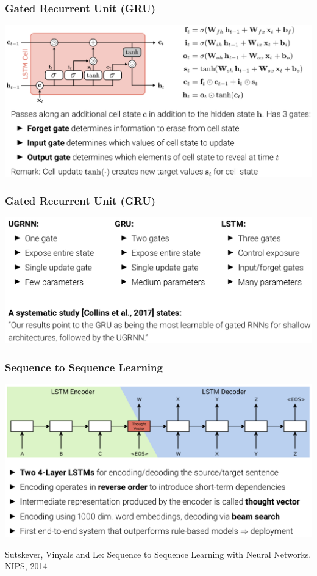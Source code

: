 \documentclass[10pt]{beamer}
\begin{document}
\begin{frame}
  \frametitle{Gated Recurrent Unit (GRU)}
\begin{center}
\includegraphics[width=.95\textwidth]{images/s21}
\end{center}
\end{frame}

\begin{frame}
  \frametitle{Gated Recurrent Unit (GRU)}
\begin{center}
\includegraphics[width=.95\textwidth]{images/missing}
\end{center}
\end{frame}


\begin{frame}
  \frametitle{Sequence to Sequence Learning}
\begin{center}
\includegraphics[width=.9\textwidth]{images/sa}
\end{center}
\scriptsize{Sutskever, Vinyals and Le: Sequence to Sequence Learning with Neural Networks. NIPS, 2014}
\end{frame}
\end{document}
